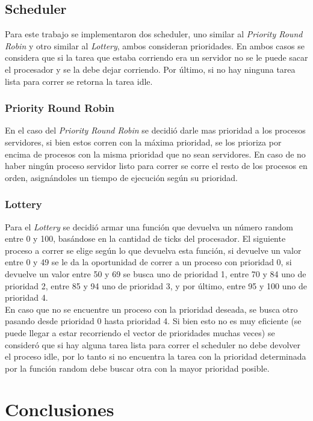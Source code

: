 \documentclass[a4paper,10pt]{article}
\begin{document}
\subsection{Scheduler}
Para este trabajo se implementaron dos scheduler, uno similar al \textit{Priority Round Robin} 
y otro similar al \textit{Lottery}, ambos consideran prioridades. En ambos casos se considera 
que si la tarea que estaba corriendo era un servidor no se le puede sacar el procesador y se 
la debe dejar corriendo. Por último, si no hay ninguna tarea lista para correr se retorna la 
tarea idle.

\subsubsection{Priority Round Robin}
En el caso del \textit{Priority Round Robin} se decidió darle mas prioridad a los procesos 
servidores, si bien estos corren con la máxima prioridad, se los prioriza por encima de procesos 
con la misma prioridad que no sean servidores. En caso de no haber ningún proceso servidor listo 
para correr se corre el resto de los procesos en orden, asignándoles un tiempo de ejecución según 
su prioridad.

\subsubsection{Lottery}
Para el \textit{Lottery} se decidió armar una función que devuelva un número random entre 0 y 100, basándose 
en la cantidad de ticks del procesador. El siguiente proceso a correr se elige según lo que devuelva esta función, 
si devuelve un valor entre 0 y 49 se le da la oportunidad de correr a un proceso con prioridad 0, 
si devuelve un valor entre 50 y 69 se busca uno de prioridad 1, entre 70 y 84 uno de prioridad 2, entre 85 y 94 
uno de prioridad 3, y por último, entre 95 y 100 uno de prioridad 4.\\
En caso que no se encuentre un proceso con la prioridad deseada, se busca otro pasando desde prioridad 0 hasta 
prioridad 4. Si bien esto no es muy eficiente (se puede llegar a estar recorriendo el vector de prioridades muchas 
veces) se consideró que si hay alguna tarea lista para correr el scheduler no debe devolver el proceso idle, por lo 
tanto si no encuentra la tarea con la prioridad determinada por la función random debe buscar otra con la mayor 
prioridad posible.


\newpage
\section{Conclusiones}

\bigskip
\end{document}
